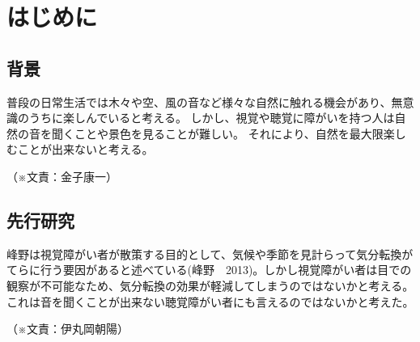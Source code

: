 \documentclass[11pt,a4paper]{report}
\newcommand{\Writer}[1]{
  \normalsize
  \begin{flushright}
    （※文責：#1）
  \end{flushright}
}
\begin{document}
\chapter{はじめに}
\section{背景}
\noindent\space
普段の日常生活では木々や空、風の音など様々な自然に触れる機会があり、無意識のうちに楽しんでいると考える。
しかし、視覚や聴覚に障がいを持つ人は自然の音を聞くことや景色を見ることが難しい。
それにより、自然を最大限楽しむことが出来ないと考える。
\Writer{金子康一}

\section{先行研究}
\noindent\space
峰野は視覚障がい者が散策する目的として、気候や季節を見計らって気分転換がてらに行う要因があると述べている(峰野　2013\cite{先行研究})。しかし視覚障がい者は目での観察が不可能なため、気分転換の効果が軽減してしまうのではないかと考える。これは音を聞くことが出来ない聴覚障がい者にも言えるのではないかと考えた。
\Writer{伊丸岡朝陽}
\end{document}
